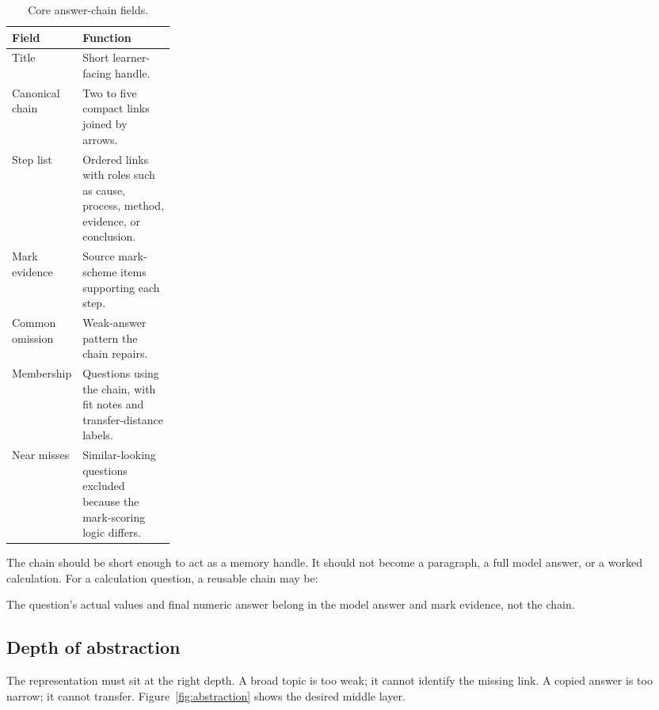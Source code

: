 \documentclass[11pt]{article}
\begin{document}
\begin{table}[H]
\centering
\small
\begin{tabularx}{\linewidth}{L{0.24\linewidth}Y}
\toprule
\textbf{Field} & \textbf{Function}\\
\midrule
Title & Short learner-facing handle.\\
Canonical chain & Two to five compact links joined by arrows.\\
Step list & Ordered links with roles such as cause, process, method, evidence, or conclusion.\\
Mark evidence & Source mark-scheme items supporting each step.\\
Common omission & Weak-answer pattern the chain repairs.\\
Membership & Questions using the chain, with fit notes and transfer-distance labels.\\
Near misses & Similar-looking questions excluded because the mark-scoring logic differs.\\
\bottomrule
\end{tabularx}
\caption{Core answer-chain fields.}
\label{tab:chainfields}
\end{table}

The chain should be short enough to act as a memory handle. It should not become a paragraph, a full model answer, or a worked calculation. For a calculation question, a reusable chain may be:

\begin{center}
\end{center}

The question's actual values and final numeric answer belong in the model answer and mark evidence, not the chain.

\subsection{Depth of abstraction}

The representation must sit at the right depth. A broad topic is too weak; it cannot identify the missing link. A copied answer is too narrow; it cannot transfer. Figure~\ref{fig:abstraction} shows the desired middle layer.
\end{document}

